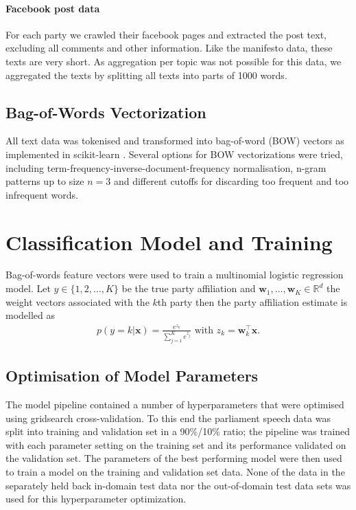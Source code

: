 \documentclass[11pt]{article}
\renewcommand{\vec}[1]{\mathbf{#1}}
\newcommand{\R}{\mathds{R}}
\begin{document}
\paragraph{Facebook post data}
For each party we crawled their facebook pages \cite{gruene-fb, spd-fb, cducsu-fb, linke-fb} and extracted the post text, excluding all comments and other information. Like the manifesto data, these texts are very short. As aggregation per topic was not possible for this data, we aggregated the texts by splitting all texts into parts of 1000 words. 

\subsection{Bag-of-Words Vectorization}\label{sec:bow-vectorization}
All text data was tokenised and transformed into bag-of-word (BOW) vectors as implemented in scikit-learn \cite{scikit-learn}. Several options for BOW vectorizations were tried, including term-frequency-inverse-document-frequency normalisation, n-gram patterns up to size $n=3$ and different cutoffs for discarding too frequent and too infrequent words.

\section{Classification Model and Training}\label{sec:model}
Bag-of-words feature vectors were used to train a multinomial logistic regression model. Let $y\in\{1,2,\dots,K\}$ be the true party affiliation and $\vec{w}_1,\dots,\vec{w}_K\in\R^{d}$ the weight vectors associated with the $k$th party then the party affiliation estimate is modelled as
\begin{eqnarray}\label{eq:logreg_multiclass}
p(y=k|\vec{x}) = \frac{e^{z_k}}{\sum_{j=1}^K e^{z_j}}  \textrm{ with }  z_k=\vec{w}_k^{\top}\vec{x}.
\end{eqnarray}

\subsection{Optimisation of Model Parameters}\label{sec:crossvalidation}
The model pipeline contained a number of  hyperparameters that were optimised using gridsearch cross-validation. To this end the parliament speech data was split into training and validation set in a 90\%/10\% ratio; the pipeline was trained with each parameter setting on the training set and its performance validated on the validation set. The parameters of the best performing model were then used to train a model on the training and validation set data. None of the data in the separately held back in-domain test data nor the out-of-domain test data sets was used for this hyperparameter optimization. 
%
\end{document}
